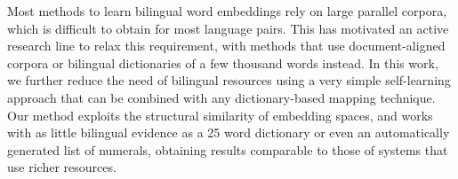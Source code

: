 Most methods to learn bilingual word embeddings rely on large parallel corpora, which is difficult to obtain for most language pairs. This has motivated an active research line to relax this requirement, with methods that use document-aligned corpora or bilingual dictionaries of a few thousand words instead. In this work, we further reduce the need of bilingual resources using a very simple self-learning approach that can be combined with any dictionary-based mapping technique. Our method exploits the structural similarity of embedding spaces, and works with as little bilingual evidence as a 25 word dictionary or even an automatically generated list of numerals, obtaining results comparable to those of systems that use richer resources.
